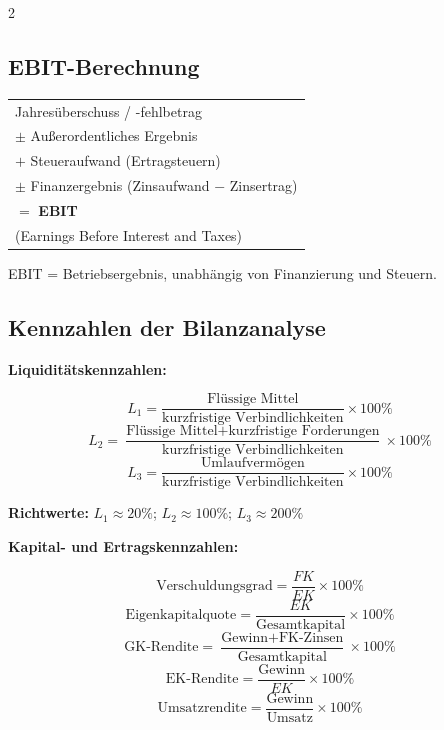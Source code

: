 \documentclass[10pt,a4paper]{article}
\begin{document}
\begin{multicols}{2}
\subsection{EBIT-Berechnung}

\begin{formelbox}
\renewcommand{\arraystretch}{1.1}
\begin{tabular}{@{}l@{}}
Jahresüberschuss / -fehlbetrag \\
$\pm$ Außerordentliches Ergebnis \\
$+$ Steueraufwand (Ertragsteuern) \\
$\pm$ Finanzergebnis (Zinsaufwand $-$ Zinsertrag) \\
\hline
$=$ \textbf{EBIT} \\
\quad (Earnings Before Interest and Taxes) \\
\end{tabular}
\end{formelbox}

EBIT = Betriebsergebnis, unabhängig von Finanzierung und Steuern.

\columnbreak

\subsection{Kennzahlen der Bilanzanalyse}

\textbf{Liquiditätskennzahlen:}

\begin{formelbox}
\[
L_1 = \frac{\text{Flüssige Mittel}}{\text{kurzfristige Verbindlichkeiten}} \times 100\%
\]
\[
L_2 = \frac{\text{Flüssige Mittel} + \text{kurzfristige Forderungen}}{\text{kurzfristige Verbindlichkeiten}} \times 100\%
\]
\[
L_3 = \frac{\text{Umlaufvermögen}}{\text{kurzfristige Verbindlichkeiten}} \times 100\%
\]
\end{formelbox}

\textbf{Richtwerte:} $L_1 \approx 20\%$; $L_2 \approx 100\%$; $L_3 \approx 200\%$

\vspace{4pt}
\textbf{Kapital- und Ertragskennzahlen:}

\begin{formelbox}
\[
\text{Verschuldungsgrad} = \frac{FK}{EK} \times 100\%
\]
\[
\text{Eigenkapitalquote} = \frac{EK}{\text{Gesamtkapital}} \times 100\%
\]
\[
\text{GK-Rendite} = \frac{\text{Gewinn} + \text{FK-Zinsen}}{\text{Gesamtkapital}} \times 100\%
\]
\[
\text{EK-Rendite} = \frac{\text{Gewinn}}{EK} \times 100\%
\]
\[
\text{Umsatzrendite} = \frac{\text{Gewinn}}{\text{Umsatz}} \times 100\%
\]
\end{formelbox}


\end{multicols}
\end{document}
